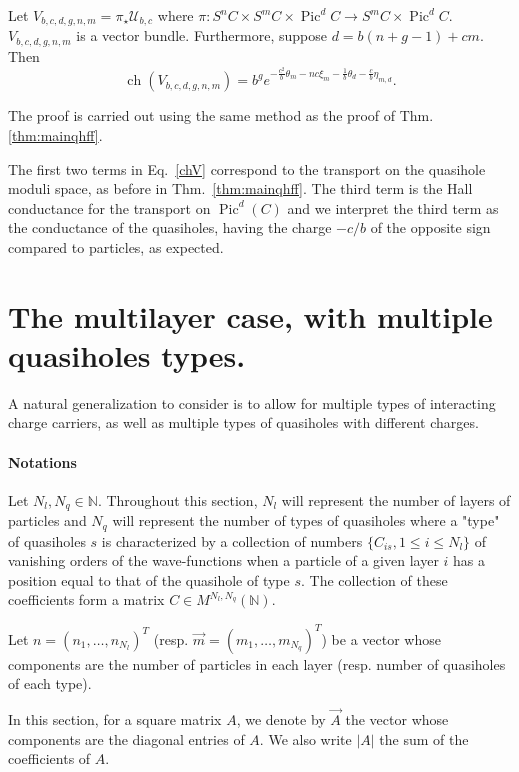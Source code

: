 \documentclass{article}
\theoremstyle{definition}
\DeclareMathOperator{\pic}{\text{Pic}}
\DeclareMathOperator{\ch}{ch}
\renewcommand{\leq}{\leqslant}
\begin{document}
\begin{proposition}
Let $V_{b,c,d,g,n,m}=\pi_\star \mathcal{U}_{b,c}$ where $\pi:S^n C \times S^m C \times \pic^d C\to S^m C \times \pic^d C$. $V_{b,c,d,g,n,m}$ is a vector bundle. Furthermore, suppose $d=b(n+g-1)+cm$. Then 
    \begin{equation}\label{chV}
        \ch(V_{b,c,d,g,n,m})=b^g e^{-\frac{c^2}{b}\theta_m  -n c \xi_m-\frac{1}{b}\theta_{d} - \frac{c}{b}\eta_{m,d}}.\end{equation}
\end{proposition}

The proof is carried out using the same method as the proof of Thm. \ref{thm:mainqhff}. 

The first two terms in Eq.\ \eqref{chV} correspond to the transport on the quasihole moduli space, as before in Thm.\ \ref{thm:mainqhff}. The third term is the Hall conductance for the transport on $\pic^d(C)$ and we interpret the third term as the 
conductance of the quasiholes, having the charge $-c/b$ of the opposite sign compared to particles, as expected.

\section{The multilayer case, with multiple quasiholes types.}
\label{sec:multilayer}
A natural generalization to consider is to allow for multiple types of interacting charge carriers, as well as multiple types of quasiholes with different charges. 
\paragraph{Notations}
Let $N_{l}, N_{q} \in \mathbb{N}$. Throughout this section, $N_l$ will represent the number of layers of particles and $N_q$ will represent the number of types of quasiholes where a "type" of quasiholes $s$ is characterized by a collection of numbers $\lbrace C_{is}, 1\leq i \leq N_l\rbrace$ of vanishing orders of the wave-functions when a particle of a given layer $i$ has a position equal to that of the quasihole of type $s$. The collection of these coefficients form a matrix $C\in M^{N_l,{N_q}}(\mathbb{N})$.

Let $n=(n_1,\dots,n_{N_l})^T$ (resp. $\vec{m}=(m_1,\dots,m_{N_q})^T$) be a vector whose components are the number of particles in each layer (resp. number of quasiholes of each type).

In this section, for a square matrix $A$, we denote by $\vec{A}$ the vector whose components are the diagonal entries of $A$. We also write $|A|$ the sum of the coefficients of $A$. 
\end{document}
